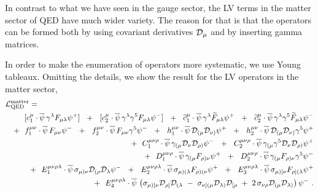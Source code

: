 \documentclass[12pt,preprintnumbers,nofootinbib]{revtex4}
\newcommand{\wt}{\widetilde}
\newcommand{\ov}{\overline}
\newcommand{\md}{\mathcal{D}}
\begin{document}
	In contrast to what we have seen in the gauge sector, 
	the LV terms in the matter sector of QED have much
	wider variety.
	The reason for that is that the operators can be formed both
	by using covariant derivatives $ \cal{D}_\mu $ and by 
	inserting gamma matrices.
	
	In order to make the enumeration of operators more systematic, we use 
     Young tableaux.
	Omitting the details, we show the result for the LV operators
	in the matter sector, 
\begin{eqnarray}
\nonumber
\lefteqn{
	\mathcal{L}_{\rm QED}^{\rm matter} = 
	}
	\\
\nonumber
	&&
	\phantom{+~~}
	[c_1^{\mu}\cdot
	\ov{\psi}\, \gamma^\lambda F_{\mu\lambda} \psi {}^{+}] ~~+~~
	[c_2^{\mu}\cdot
	\ov{\psi}\, \gamma^\lambda \gamma^5 F_{\mu\lambda} \psi {}^{-}] ~~+~~
	\wt{c}_1^{\mu}\cdot
	\ov{\psi}\, \gamma^\lambda \wt{F}_{\mu\lambda} \psi {}^{+} ~~+~~
	\wt{c}_2^{\mu}\cdot
	\ov{\psi}\, \gamma^\lambda \gamma^5 \wt{F}_{\mu\lambda} \psi {}^{-}
	\\
\nonumber
	&&
	+~~
	f_1^{\mu\nu}\cdot
	\ov{\psi}\, F_{\mu\nu} \psi {}^{-} ~~+~~
	f_2^{\mu\nu}\cdot
	\ov{\psi}\, F_{\mu\nu} \gamma^5 \psi {}^{-} ~~+~~
	h_1^{\mu\nu}\cdot
	\ov{\psi}\, \mathcal{D}_{(\mu} \mathcal{D}_{\nu)} \psi {}^{+} ~~+~~
	h_2^{\mu\nu}\cdot
	\ov{\psi}\, \mathcal{D}_{(\mu} \mathcal{D}_{\nu)} \gamma^5 \psi {}^{+} 
	\\
\label{QED_matter}
	&&
	+~~
	C_1^{\mu\nu\rho}\cdot
	\ov{\psi}\, \gamma_{(\mu} 
		\mathcal{D}_\nu \mathcal{D}_{\rho)} \psi {}^{-} ~~+~~
	C_2^{\mu\nu\rho}\cdot
	\ov{\psi}\, \gamma_{(\mu} \gamma^5
	\mathcal{D}_\nu \mathcal{D}_{\rho)} \psi {}^{+} 
	\\
\nonumber
	&&
	+~~
	D_1^{\mu\nu\rho}\cdot
	\ov{\psi}\, \gamma_{(\mu} F_{\rho)\nu} \psi {}^{+} ~~+~~
	D_2^{\mu\nu\rho}\cdot
	\ov{\psi}\, \gamma_{(\mu} F_{\rho)\nu} \gamma^5 \psi {}^{-} 
	\\
\nonumber
	&&
	+~~
	E_1^{\mu\nu\rho\lambda}\cdot
	\ov{\psi}\, \sigma_{\mu)\nu} \mathcal{D}_{(\rho}\mathcal{D}_\lambda 
			\psi {}^{-} ~~+~~
	E_2^{\mu\nu\rho\lambda}\cdot
	\ov{\psi}\, \sigma_{\mu)(\lambda} F_{\rho)(\nu} \psi {}^{+} ~~+~~
	E_3^{\mu\nu\rho\lambda}\cdot
	\ov{\psi}\, \sigma_{\mu)[\nu} F_{\rho](\lambda} \psi {}^{+} 
	\\
\nonumber
	&&
	+~~
	E_4^{\mu\nu\rho\lambda}\cdot
	\ov{\psi}\, \left ( 
		\sigma_{\mu)[\nu} \mathcal{D}_{\rho]}\mathcal{D}_{(\lambda}
		~-~
		\sigma_{\nu](\mu} \mathcal{D}_{\lambda)}\mathcal{D}_{[\rho}
		~+~
		2\, \sigma_{\nu\rho} \md_{(\mu} \md_{\lambda)}
		\right ) \psi {}^{-} 
	~.
\end{eqnarray}
\end{document}
